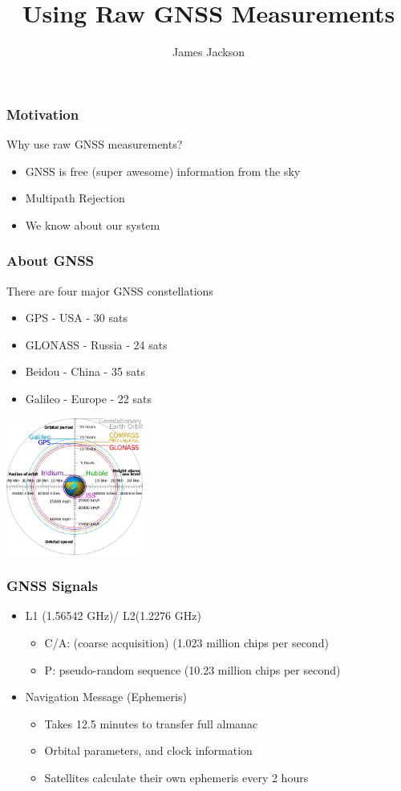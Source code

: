 \documentclass{beamer}
\title{Using Raw GNSS Measurements}
\author{James Jackson}
\institute{MAGICC Lab \\ Brigham Young University}
\begin{document}
\begin{frame}
\titlepage
\end{frame}

\begin{frame} \frametitle{Motivation}
Why use raw GNSS measurements?
\begin{itemize}
	\item GNSS is free (super awesome) information from the sky
	\item Multipath Rejection
	\item We know about our system
\end{itemize}
\end{frame}


\begin{frame} \frametitle{About GNSS}

There are four major GNSS constellations
\begin{itemize}
	\item GPS - USA - 30 sats
	\item GLONASS - Russia - 24 sats
	\item Beidou - China - 35 sats
	\item Galileo - Europe - 22 sats
\end{itemize}
\centering
	\includegraphics[width=45mm]{images/gnss_orbits.png}
\end{frame}

\begin{frame} \frametitle{GNSS Signals}
\begin{itemize}
	\item L1 (1.56542 GHz)/ L2(1.2276 GHz)
	\begin{itemize}
		\item C/A: (coarse acquisition) (1.023 million chips per second)
		\item P: pseudo-random sequence (10.23 million chips per second)
	\end{itemize}


	\item Navigation Message (Ephemeris)
	\begin{itemize}
		\item Takes 12.5 minutes to transfer full almanac
		\item Orbital parameters, and clock information
		\item Satellites calculate their own ephemeris every 2 hours
	\end{itemize}
\end{itemize}
\end{frame}
\end{document}
